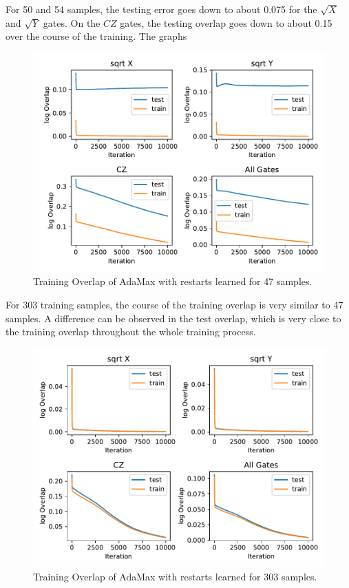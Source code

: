For 50 and 54 samples, the testing error goes down to about 0.075 for the $\sqrt{X}$ and $\sqrt{Y}$ gates. 
On the $CZ$ gates, the testing overlap goes down to about 0.15 over the course of the training. The graphs 

\begin{figure}[H]
  \centering
  \includegraphics[width=\textwidth]{figures/results/AM-restarts-learned/avgOverlap_47.pdf}
  \caption[Training overlap of AdaMax with restarts learned]{Training 
  Overlap of AdaMax with restarts learned for 47 samples.}
  \label{fig:am_overlap_47}
\end{figure}

For 303 training samples, the course of the training overlap is very similar to 47 samples.
A difference can be observed in the test overlap, which is very close to the training overlap 
throughout the whole training process.

\begin{figure}[H]
  \centering
  \includegraphics[width=\textwidth]{figures/results/AM-restarts-learned/avgOverlap_303.pdf}
  \caption[Training overlap of AdaMax with restarts learned]{Training 
  Overlap of AdaMax with restarts learned for 303 samples.}
  \label{fig:am_overlap_303}
\end{figure}
